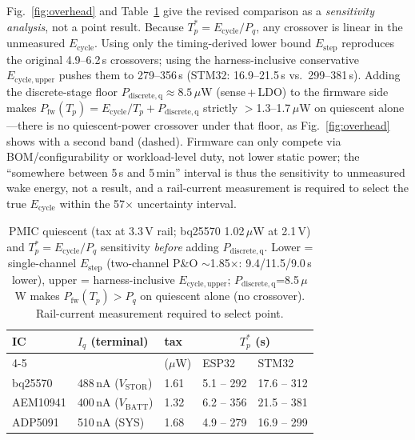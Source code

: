 \documentclass[10pt, conference, letterpaper]{IEEEtran}
\begin{document}
Fig.~\ref{fig:overhead} and Table~\ref{tab:ic} give the revised comparison as a \emph{sensitivity analysis}, not a point result. Because $T_p^*=E_{\mathrm{cycle}}/P_q$, any crossover is linear in the unmeasured $E_{\mathrm{cycle}}$. Using only the timing-derived lower bound $E_{\mathrm{step}}$ reproduces the original 4.9--6.2\,s crossovers; using the harness-inclusive conservative $E_{\mathrm{cycle,upper}}$ pushes them to 279--356\,s (STM32: 16.9--21.5\,s vs.\ 299--381\,s). Adding the discrete-stage floor $P_{\mathrm{discrete,q}}\approx8.5\,\mu$W (sense\,+\,LDO) to the firmware side makes $P_{\mathrm{fw}}(T_p)=E_{\mathrm{cycle}}/T_p+P_{\mathrm{discrete,q}}$ strictly $>$1.3--1.7\,$\mu$W on quiescent alone---there is no quiescent-power crossover under that floor, as Fig.~\ref{fig:overhead} shows with a second band (dashed). Firmware can only compete via BOM/configurability or workload-level duty, not lower static power; the ``somewhere between 5\,s and 5\,min'' interval is thus the sensitivity to unmeasured wake energy, not a result, and a rail-current measurement is required to select the true $E_{\mathrm{cycle}}$ within the 57$\times$ uncertainty interval.

\begin{table}[t]
\centering
\caption{PMIC quiescent (tax at 3.3\,V rail; bq25570 1.02\,$\mu$W at 2.1\,V) and $T_p^*=E_{\mathrm{cycle}}/P_q$ sensitivity \emph{before} adding $P_{\mathrm{discrete,q}}$. Lower = single-channel $E_{\mathrm{step}}$ (two-channel P\&O $\sim$1.85$\times$: 9.4/11.5/9.0\,s lower), upper = harness-inclusive $E_{\mathrm{cycle,upper}}$; $P_{\mathrm{discrete,q}}$=8.5\,$\mu$W makes $P_{\mathrm{fw}}(T_p)>P_q$ on quiescent alone (no crossover). Rail-current measurement required to select point.}
\label{tab:ic}
{\footnotesize\setlength{\tabcolsep}{3pt}
\begin{tabular}{l l l l l}
\toprule
IC & $I_q$ (terminal) & tax & \multicolumn{2}{c}{$T_p^*$ (s)} \\
\cmidrule(lr){4-5}
 &  & ($\mu$W) & ESP32 & STM32 \\
\midrule
bq25570 & 488\,nA ($V_{\mathrm{STOR}}$) & 1.61 & 5.1 -- 292 & 17.6 -- 312 \\
AEM10941 & 400\,nA ($V_{\mathrm{BATT}}$) & 1.32 & 6.2 -- 356 & 21.5 -- 381 \\
ADP5091 & 510\,nA (SYS) & 1.68 & 4.9 -- 279 & 16.9 -- 299 \\
\bottomrule
\end{tabular}}
\end{table}
\end{document}
